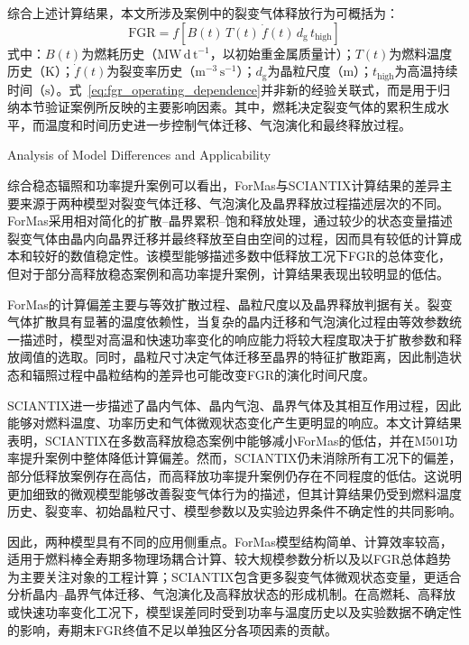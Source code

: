 综合上述计算结果，本文所涉及案例中的裂变气体释放行为可概括为：
\begin{equation}
	\mathrm{FGR}
	=
	f\left[
	B(t)\,
	T(t)\,
	\dot{f}(t)\,
	d_{\mathrm{g}}\,
	t_{\mathrm{high}}
	\right]
	\label{eq:fgr_operating_dependence}
\end{equation}
\noindent 式中：$B(t)$为燃耗历史（$\mathrm{MW\,d\,t^{-1}}$，以初始重金属质量计）；$T(t)$为燃料温度历史（$\mathrm{K}$）；$\dot{f}(t)$为裂变率历史（$\mathrm{m^{-3}\,s^{-1}}$）；$d_{\mathrm{g}}$为晶粒尺度（$\mathrm{m}$）；$t_{\mathrm{high}}$为高温持续时间（$\mathrm{s}$）。式~\eqref{eq:fgr_operating_dependence}并非新的经验关联式，而是用于归纳本节验证案例所反映的主要影响因素。其中，燃耗决定裂变气体的累积生成水平，而温度和时间历史进一步控制气体迁移、气泡演化和最终释放过程。

{Analysis of Model Differences and Applicability}

综合稳态辐照和功率提升案例可以看出，ForMas与SCIANTIX计算结果的差异主要来源于两种模型对裂变气体迁移、气泡演化及晶界释放过程描述层次的不同。ForMas采用相对简化的扩散--晶界累积--饱和释放处理，通过较少的状态变量描述裂变气体由晶内向晶界迁移并最终释放至自由空间的过程，因而具有较低的计算成本和较好的数值稳定性。该模型能够描述多数中低释放工况下FGR的总体变化，但对于部分高释放稳态案例和高功率提升案例，计算结果表现出较明显的低估。

ForMas的计算偏差主要与等效扩散过程、晶粒尺度以及晶界释放判据有关。裂变气体扩散具有显著的温度依赖性，当复杂的晶内迁移和气泡演化过程由等效参数统一描述时，模型对高温和快速功率变化的响应能力将较大程度取决于扩散参数和释放阈值的选取。同时，晶粒尺寸决定气体迁移至晶界的特征扩散距离，因此制造状态和辐照过程中晶粒结构的差异也可能改变FGR的演化时间尺度。

SCIANTIX进一步描述了晶内气体、晶内气泡、晶界气体及其相互作用过程，因此能够对燃料温度、功率历史和气体微观状态变化产生更明显的响应。本文计算结果表明，SCIANTIX在多数高释放稳态案例中能够减小ForMas的低估，并在M501功率提升案例中整体降低计算偏差。然而，SCIANTIX仍未消除所有工况下的偏差，部分低释放案例存在高估，而高释放功率提升案例仍存在不同程度的低估。这说明更加细致的微观模型能够改善裂变气体行为的描述，但其计算结果仍受到燃料温度历史、裂变率、初始晶粒尺寸、模型参数以及实验边界条件不确定性的共同影响。

因此，两种模型具有不同的应用侧重点。ForMas模型结构简单、计算效率较高，适用于燃料棒全寿期多物理场耦合计算、较大规模参数分析以及以FGR总体趋势为主要关注对象的工程计算；SCIANTIX包含更多裂变气体微观状态变量，更适合分析晶内--晶界气体迁移、气泡演化及高释放状态的形成机制。在高燃耗、高释放或快速功率变化工况下，模型误差同时受到功率与温度历史以及实验数据不确定性的影响，寿期末FGR终值不足以单独区分各项因素的贡献。

